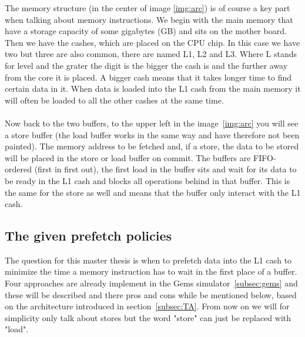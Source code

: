  The memory structure (in the center of image \ref{img:arc}) is of course a key part when talking about memory instructions. We begin with the main memory that have a storage capacity of some gigabytes (GB) and sits on the mother board. Then we have the cashes, which are placed on the CPU chip. In this case we have two but three are also common, there are named L1, L2 and L3. Where L stands for level and the grater the digit is the  bigger the cash is and the further away from the core it is placed. A bigger cash means that it takes longer time to find certain data in it. When data is loaded into the L1 cash from the main memory it will often be loaded to all the other cashes at the same time. 
 \\ \\
 Now back to the two buffers, to the upper left in the image~\ref{img:arc} you will see a store buffer (the load buffer works in the same way and  have therefore not been painted). The memory address to be fetched and, if a store, the data to be stored will be placed in the store or load buffer on commit. The buffers are FIFO-ordered (first in first out), the first load in the buffer sits and wait for its data to be ready in the L1 cash and blocks all operations behind in that buffer. This is the same for the store as well and means that the buffer only interact with the L1 cash.
\subsection{The given prefetch policies}
\label{subsec:GPP}
The question for this master thesis is when to prefetch data into the L1 cash to minimize the time a memory instruction has to wait in the first place of a buffer. Four approaches are already implement in the Gems simulator~\ref{subsec:gems} and these will be described and there pros and cons while be mentioned below, based on the architecture introduced in section~\ref{subsec:TA}. From now on we will for simplicity only talk about stores but the word "store" can just be replaced with "load". \\

